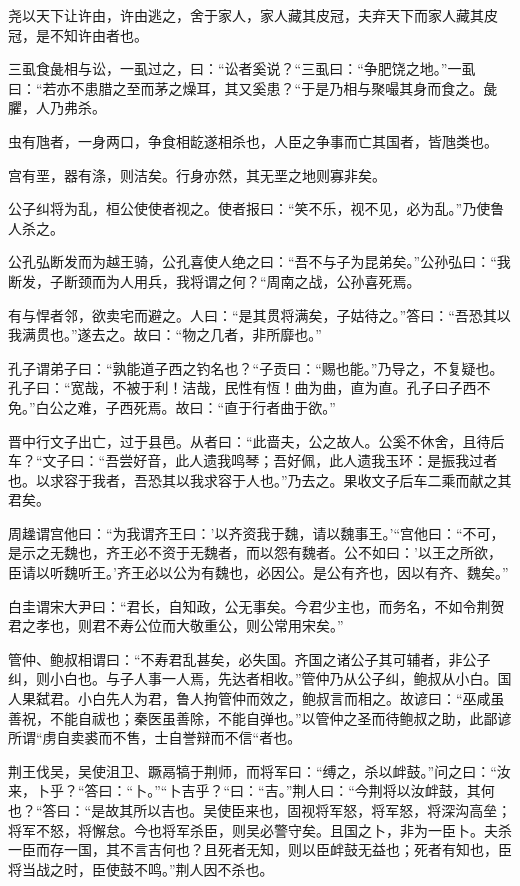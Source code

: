 \documentclass[]{article}
\begin{document}
尧以天下让许由，许由逃之，舍于家人，家人藏其皮冠，夫弃天下而家人藏其皮冠，是不知许由者也。

三虱食彘相与讼，一虱过之，曰：``讼者奚说？``三虱曰：``争肥饶之地。''一虱曰：``若亦不患腊之至而茅之燥耳，其又奚患？``于是乃相与聚嘬其身而食之。彘臞，人乃弗杀。

虫有虺者，一身两口，争食相龁遂相杀也，人臣之争事而亡其国者，皆虺类也。

宫有垩，器有涤，则洁矣。行身亦然，其无垩之地则寡非矣。

公子纠将为乱，桓公使使者视之。使者报曰：``笑不乐，视不见，必为乱。''乃使鲁人杀之。

公孔弘断发而为越王骑，公孔喜使人绝之曰：``吾不与子为昆弟矣。''公孙弘曰：``我断发，子断颈而为人用兵，我将谓之何？``周南之战，公孙喜死焉。

有与悍者邻，欲卖宅而避之。人曰：``是其贯将满矣，子姑待之。''答曰：``吾恐其以我满贯也。''遂去之。故曰：``物之几者，非所靡也。''

孔子谓弟子曰：``孰能道子西之钓名也？``子贡曰：``赐也能。''乃导之，不复疑也。孔子曰：``宽哉，不被于利！洁哉，民性有恆！曲为曲，直为直。孔子曰子西不免。''白公之难，子西死焉。故曰：``直于行者曲于欲。''

晋中行文子出亡，过于县邑。从者曰：``此啬夫，公之故人。公奚不休舍，且待后车？``文子曰：``吾尝好音，此人遗我鸣琴；吾好佩，此人遗我玉环：是振我过者也。以求容于我者，吾恐其以我求容于人也。''乃去之。果收文子后车二乘而献之其君矣。

周趮谓宫他曰：``为我谓齐王曰：'以齐资我于魏，请以魏事王。'``宫他曰：``不可，是示之无魏也，齐王必不资于无魏者，而以怨有魏者。公不如曰：'以王之所欲，臣请以听魏听王。'齐王必以公为有魏也，必因公。是公有齐也，因以有齐、魏矣。''

白圭谓宋大尹曰：``君长，自知政，公无事矣。今君少主也，而务名，不如令荆贺君之孝也，则君不寿公位而大敬重公，则公常用宋矣。''

管仲、鲍叔相谓曰：``不寿君乱甚矣，必失国。齐国之诸公子其可辅者，非公子纠，则小白也。与子人事一人焉，先达者相收。''管仲乃从公子纠，鲍叔从小白。国人果弑君。小白先人为君，鲁人拘管仲而效之，鲍叔言而相之。故谚曰：``巫咸虽善祝，不能自祓也；秦医虽善除，不能自弹也。''以管仲之圣而待鲍叔之助，此鄙谚所谓``虏自卖裘而不售，士自誉辩而不信``者也。

荆王伐吴，吴使沮卫、蹶鬲犒于荆师，而将军曰：``缚之，杀以衅鼓。''问之曰：``汝来，卜乎？``答曰：``卜。''``卜吉乎？``曰：``吉。''荆人曰：``今荆将以汝衅鼓，其何也？``答曰：``是故其所以吉也。吴使臣来也，固视将军怒，将军怒，将深沟高垒；将军不怒，将懈怠。今也将军杀臣，则吴必警守矣。且国之卜，非为一臣卜。夫杀一臣而存一国，其不言吉何也？且死者无知，则以臣衅鼓无益也；死者有知也，臣将当战之时，臣使鼓不鸣。''荆人因不杀也。
\end{document}
